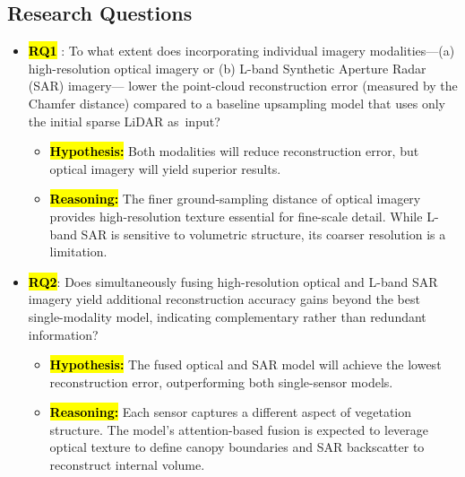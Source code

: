 \documentclass[remotesensing,article,accept,pdftex,moreauthors]{Definitions/mdpi}
\begin{document}
\subsection{Research Questions}
\begin{itemize}
  \item \textbf{\hl{RQ1}%
}: To what extent does incorporating individual imagery modalities---(a) high-resolution optical imagery or (b) L-band Synthetic Aperture Radar (SAR) imagery---%
lower the point-cloud reconstruction error (measured by the Chamfer distance) compared to a baseline upsampling model that uses only the initial sparse LiDAR \mbox{as input}?
        \begin{itemize}
          \item \textbf{\hl{Hypothesis:}} Both modalities will reduce reconstruction error, but optical imagery will yield superior results.
          \item \textbf{\hl{Reasoning:}} The finer ground-sampling distance of optical imagery provides high-resolution texture essential for fine-scale detail. While L-band SAR is sensitive to volumetric structure, its coarser resolution is a limitation.
        \end{itemize}

  \item \textbf{\hl{RQ2}}: Does simultaneously fusing high-resolution optical and L-band SAR imagery yield additional reconstruction accuracy gains beyond the best single-modality model, indicating complementary rather than redundant information?
        \begin{itemize}
          \item \textbf{\hl{Hypothesis:}} The fused optical and SAR model will achieve the lowest reconstruction error, outperforming both single-sensor models.
          \item \textbf{\hl{Reasoning:}} Each sensor captures a different aspect of vegetation structure. The model's attention-based fusion is expected to leverage optical texture to define canopy boundaries and SAR backscatter to reconstruct internal volume.
        \end{itemize}


\end{itemize}
\end{document}
